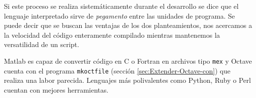 Si este proceso se realiza sistemáticamente durante el desarrollo se
dice que el lenguaje interpretado sirve de \emph{pegamento} entre las
unidades de programa. Se puede decir que se buscan las ventajas de los
dos planteamientos, nos acercamos a la velocidad del código
enteramente compilado mientras mantenemos la versatilidad de un
script.

Matlab es capaz de convertir código en C o Fortran en archivos tipo
\texttt{mex} y Octave cuenta con el programa \texttt{mkoctfile}
(sección \ref{sec:Extender-Octave-con}) que realiza una labor
parecida. Lenguajes más polivalentes como Python, Ruby o
Perl cuentan con mejores herramientas.
